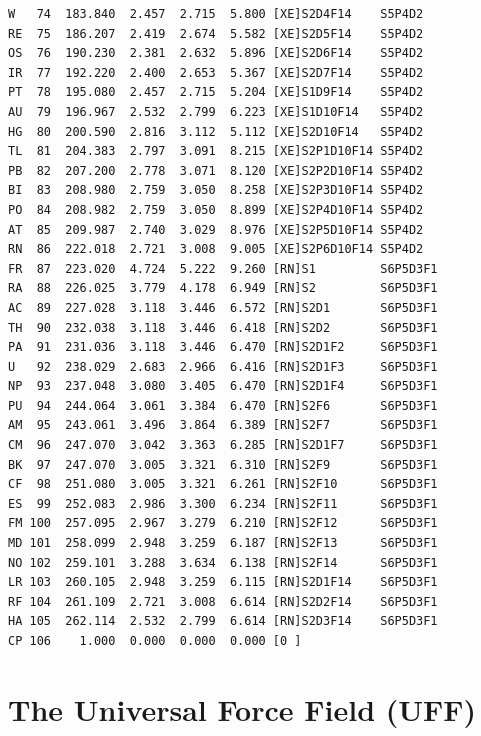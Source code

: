 \documentclass[final,12pt,makeidx,DIV=calc]{article}
\begin{document}
{{{\begin{verbatim}
W   74  183.840  2.457  2.715  5.800 [XE]S2D4F14    S5P4D2    
RE  75  186.207  2.419  2.674  5.582 [XE]S2D5F14    S5P4D2    
OS  76  190.230  2.381  2.632  5.896 [XE]S2D6F14    S5P4D2    
IR  77  192.220  2.400  2.653  5.367 [XE]S2D7F14    S5P4D2    
PT  78  195.080  2.457  2.715  5.204 [XE]S1D9F14    S5P4D2    
AU  79  196.967  2.532  2.799  6.223 [XE]S1D10F14   S5P4D2    
HG  80  200.590  2.816  3.112  5.112 [XE]S2D10F14   S5P4D2    
TL  81  204.383  2.797  3.091  8.215 [XE]S2P1D10F14 S5P4D2    
PB  82  207.200  2.778  3.071  8.120 [XE]S2P2D10F14 S5P4D2    
BI  83  208.980  2.759  3.050  8.258 [XE]S2P3D10F14 S5P4D2    
PO  84  208.982  2.759  3.050  8.899 [XE]S2P4D10F14 S5P4D2    
AT  85  209.987  2.740  3.029  8.976 [XE]S2P5D10F14 S5P4D2    
RN  86  222.018  2.721  3.008  9.005 [XE]S2P6D10F14 S5P4D2    
FR  87  223.020  4.724  5.222  9.260 [RN]S1         S6P5D3F1  
RA  88  226.025  3.779  4.178  6.949 [RN]S2         S6P5D3F1  
AC  89  227.028  3.118  3.446  6.572 [RN]S2D1       S6P5D3F1  
TH  90  232.038  3.118  3.446  6.418 [RN]S2D2       S6P5D3F1  
PA  91  231.036  3.118  3.446  6.470 [RN]S2D1F2     S6P5D3F1  
U   92  238.029  2.683  2.966  6.416 [RN]S2D1F3     S6P5D3F1  
NP  93  237.048  3.080  3.405  6.470 [RN]S2D1F4     S6P5D3F1  
PU  94  244.064  3.061  3.384  6.470 [RN]S2F6       S6P5D3F1  
AM  95  243.061  3.496  3.864  6.389 [RN]S2F7       S6P5D3F1  
CM  96  247.070  3.042  3.363  6.285 [RN]S2D1F7     S6P5D3F1  
BK  97  247.070  3.005  3.321  6.310 [RN]S2F9       S6P5D3F1  
CF  98  251.080  3.005  3.321  6.261 [RN]S2F10      S6P5D3F1  
ES  99  252.083  2.986  3.300  6.234 [RN]S2F11      S6P5D3F1  
FM 100  257.095  2.967  3.279  6.210 [RN]S2F12      S6P5D3F1  
MD 101  258.099  2.948  3.259  6.187 [RN]S2F13      S6P5D3F1  
NO 102  259.101  3.288  3.634  6.138 [RN]S2F14      S6P5D3F1  
LR 103  260.105  2.948  3.259  6.115 [RN]S2D1F14    S6P5D3F1  
RF 104  261.109  2.721  3.008  6.614 [RN]S2D2F14    S6P5D3F1  
HA 105  262.114  2.532  2.799  6.614 [RN]S2D3F14    S6P5D3F1  
CP 106    1.000  0.000  0.000  0.000 [0 ]                     
\end{verbatim}
\normalsize

\newpage
\section{The Universal Force Field (UFF)}
\label{sec:UFF}

}}}
\end{document}
